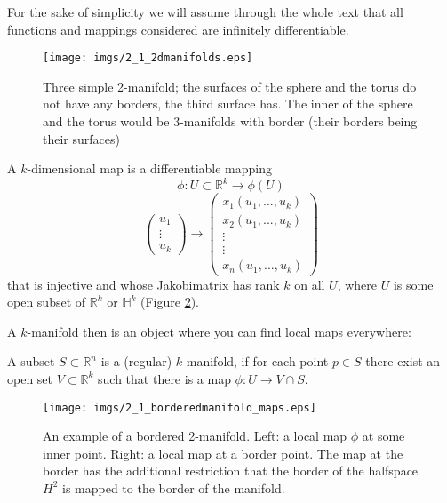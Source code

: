 For the sake of simplicity we will assume through the whole text that all functions and mappings considered are infinitely differentiable.
		
\begin{figure}
	\begin{center}
		\texttt{[image: imgs/2\_1\_2dmanifolds.eps]}
		\caption{Three simple 2-manifold; the surfaces of the sphere and the torus do not have any borders, the third surface has. The inner of the sphere and the torus would be 3-manifolds with border (their borders being their surfaces)}
		\label{fig::2_1_manifold}
	\end{center}
\end{figure}
		
\begin{definition}[Map] A $k$-dimensional map is a differentiable mapping 
\[\phi: U \subset \mathbb R^k \rightarrow \phi(U)\] 
\[\begin{pmatrix}
	u_1\\ \vdots \\ u_k
\end{pmatrix} \rightarrow \begin{pmatrix}x_1(u_1,...,u_k)\\x_2(u_1,...,u_k)\\ \vdots \\ \vdots \\ x_n(u_1,...,u_k)\end{pmatrix}\]
that is injective and whose Jakobimatrix has rank $k$ on all $U$, where $U$ is some open subset of $\mathbb R^k$ or $\mathbb H^k$ (Figure \ref{fig::2_1_mapping}).
		
\end{definition} 

A $k$-manifold then is an object where you can find local maps everywhere:

\begin{definition}[Manifold] A subset $S\subset \mathbb R^n$ is a (regular) $k$ manifold, if for each point $p \in S$ there exist an open set $V\subset \mathbb R^k$ such that there is a map $\phi: U \rightarrow  V\cap S$.
\end{definition} 

	
\begin{figure}
	\begin{center}
		\texttt{[image: imgs/2\_1\_borderedmanifold\_maps.eps]}
		\caption{An example of a bordered 2-manifold. Left: a local map $\phi$ at some inner point. Right: a local map at a border point. The map at the border has the additional restriction that the border of the halfspace $H^2$ is mapped to the border of the manifold.}
		\label{fig::2_1_mapping}
	\end{center}
\end{figure}

